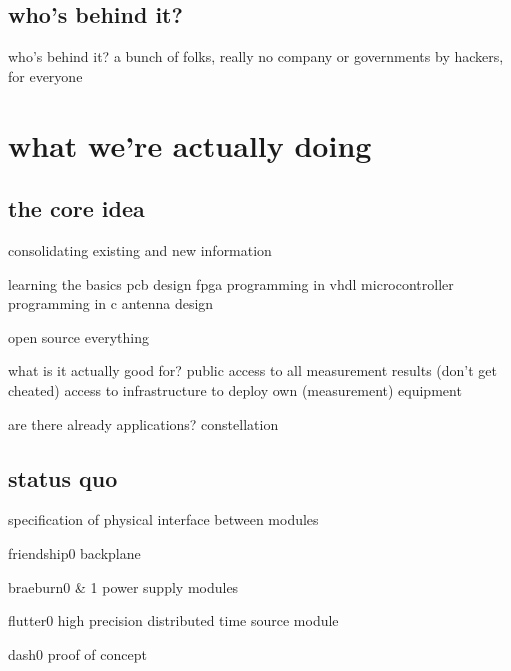 \subsection{who's behind it?}
	\begin{frame}{who's behind it?}
	a bunch of folks, really
	no company or governments
	by hackers, for everyone
	\end{frame}


\section{what we're actually doing}

\subsection{the core idea}
	\begin{frame}{consolidating existing and new information}
	\end{frame}
	\begin{frame}{learning the basics}
		pcb design
		fpga programming in vhdl
		microcontroller programming in c
		antenna design
	\end{frame}
	\begin{frame}{open source everything}
	\end{frame}
	\begin{frame}{what is it actually good for?}
		public access to all measurement results (don't get cheated)
		access to infrastructure to deploy own (measurement) equipment
	\end{frame}
	\begin{frame}{are there already applications?}
		constellation
	\end{frame}

\subsection{status quo}
  \begin{frame}{specification of physical interface between modules}
	\end{frame}
	\begin{frame}{friendship0 backplane}
	\end{frame}
	\begin{frame}{braeburn0 \& 1 power supply modules}
	\end{frame}
	\begin{frame}{flutter0 high precision distributed time source module}
	\end{frame}
	\begin{frame}{dash0 proof of concept}
	\end{frame}

